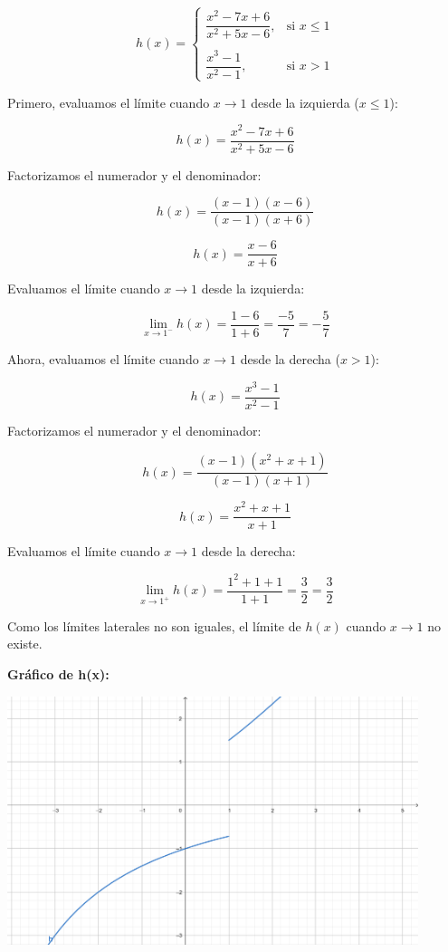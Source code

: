 \documentclass[answers]{exam} %
\begin{document}
\begin{questions}
\begin{solution}
		\[
			h(x) =
			\begin{cases}
				\dfrac{x^2 - 7x + 6}{x^2 + 5x - 6}, & \text{si } x \leq 1 \\
				\\
				\dfrac{x^3 - 1}{x^2 - 1},           & \text{si } x > 1
			\end{cases}
		\]

		Primero, evaluamos el límite cuando \( x \rightarrow 1 \) desde la izquierda (\( x \leq 1 \)):

		\[
			h(x) = \frac{x^2 - 7x + 6}{x^2 + 5x - 6}
		\]

		Factorizamos el numerador y el denominador:

		\[
			h(x) = \frac{(x - 1)(x - 6)}{(x - 1)(x + 6)}
		\]


		\[
			h(x) = \frac{x - 6}{x + 6}
		\]

		Evaluamos el límite cuando \( x \rightarrow 1 \) desde la izquierda:

		\[
			\lim_{{x \to 1^-}} h(x) = \frac{1 - 6}{1 + 6} = \frac{-5}{7} = -\frac{5}{7}
		\]

		Ahora, evaluamos el límite cuando \( x \rightarrow 1 \) desde la derecha (\( x > 1 \)):

		\[
			h(x) = \frac{x^3 - 1}{x^2 - 1}
		\]

		Factorizamos el numerador y el denominador:

		\[
			h(x) = \frac{(x - 1)(x^2 + x + 1)}{(x - 1)(x + 1)}
		\]

		\[
			h(x) = \frac{x^2 + x + 1}{x + 1}
		\]

		Evaluamos el límite cuando \( x \rightarrow 1 \) desde la derecha:

		\[
			\lim_{{x \to 1^+}} h(x) = \frac{1^2 + 1 + 1}{1 + 1} = \frac{3}{2} = \frac{3}{2}
		\]

		Como los límites laterales no son iguales, el límite de \( h(x) \) cuando \( x \rightarrow 1 \) no existe.
	\end{solution}

	\large\textbf{Gráfico de h(x):}\\[1em]
	\begin{minipage}{\textwidth}
		\centering
		\includegraphics[width=0.9\textwidth]{public/g3.png}\\
	\end{minipage}

	\vspace{0.5cm}


\end{questions}
\end{document}
